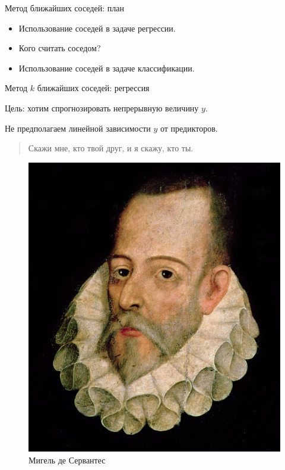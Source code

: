 
\begin{frame} %


\end{frame}



\begin{frame}{Метод ближайших соседей: план}
  \begin{itemize}[<+->]
    \item Использование соседей в задаче регрессии. 
    \item Кого считать соседом?
    \item Использование соседей в задаче классификации.
  \end{itemize}

\end{frame}


\begin{frame}{Метод $k$ ближайших соседей: регрессия}

\alert{Цель:} хотим спрогнозировать непрерывную величину $y$.
\pause


\alert{Не предполагаем} линейной зависимости $y$ от предикторов. 

\end{frame}

\begin{frame}

\begin{quotation}
  Скажи мне, кто твой друг, и я скажу, кто ты. 
\end{quotation}

\begin{minipage}[H]{0.9\linewidth}
  \begin{figure}
  \centering
    \caption{Мигель де Сервантес}
    \includegraphics[width=0.55\linewidth]{figures/Servantes.png}
  \end{figure}
\end{minipage}

\end{frame}


